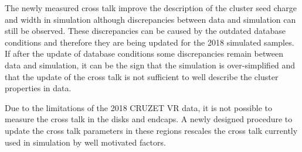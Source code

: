 The newly measured cross talk improve the description of the cluster seed charge and width in  simulation although discrepancies between data and simulation can still be observed. These discrepancies can be caused by the outdated database conditions and therefore they are being updated for the 2018 simulated samples. If after the update of database conditions some discrepancies remain between data and simulation, it can be the sign that the simulation is over-simplified and that the update of the cross talk is not sufficient to well describe the cluster properties in data.



Due to the limitations of the 2018 CRUZET VR data, it is not possible to measure the cross talk in the disks and endcaps. A newly designed procedure to update the cross talk parameters in these regions rescales the cross talk currently used in simulation  by well motivated factors. 



